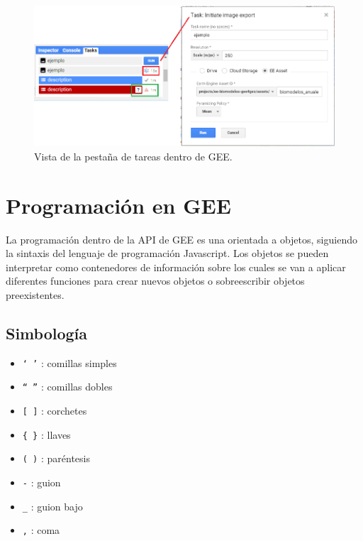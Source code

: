 \documentclass[
  12pt,
  letterpaper,
  twoside]{book}
\providecommand{\tightlist}{%
  \setlength{\itemsep}{0pt}\setlength{\parskip}{0pt}}
\begin{document}
\begin{figure}

{\centering \includegraphics[width=0.8\linewidth]{Img/task} 

}

\caption{Vista de la pestaña de tareas dentro de GEE.}\label{fig:unnamed-chunk-23}
\end{figure}

\hypertarget{programaciuxf3n-en-gee}{%
\section{Programación en GEE}\label{programaciuxf3n-en-gee}}

La programación dentro de la API de GEE es una orientada a objetos, siguiendo la sintaxis del lenguaje de programación Javascript. Los objetos se pueden interpretar como contenedores de información sobre los cuales se van a aplicar diferentes funciones para crear nuevos objetos o sobreescribir objetos preexistentes.

\hypertarget{simbologuxeda}{%
\subsection{Simbología}\label{simbologuxeda}}

\begin{itemize}
\tightlist
\item
  \texttt{‘\ ’} : comillas simples
\item
  \texttt{“\ ”} : comillas dobles
\item
  \texttt{{[}\ {]}} : corchetes
\item
  \texttt{\{\ \}} : llaves
\item
  \texttt{(\ )} : paréntesis
\item
  \texttt{-} : guion
\item
  \texttt{\_} : guion bajo
\item
  \texttt{,} : coma
\end{itemize}
\end{document}
